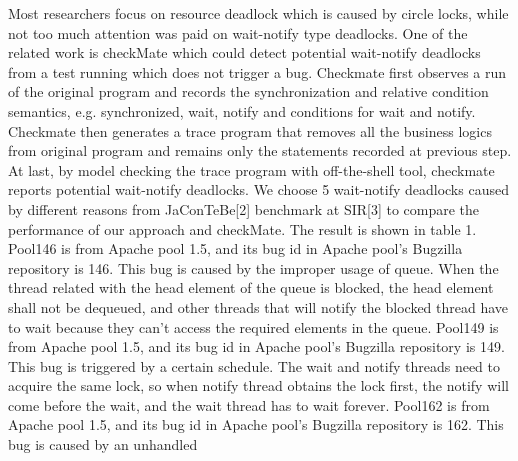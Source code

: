 \documentclass{sigplanconf}
\begin{document}
Most researchers focus on resource deadlock which is caused by circle locks, while not too much attention was paid on wait-notify type deadlocks. One of the related work is checkMate\cite{joshi2010effective} which could detect potential wait-notify deadlocks from a test running which does not trigger a bug. Checkmate first observes a run of the original program and records the synchronization and relative condition semantics, e.g. synchronized, wait, notify and conditions for wait and notify. Checkmate then generates a trace program that removes all the business logics from original program and remains only the statements recorded at previous step. At last, by model checking the trace program with off-the-shell tool, checkmate reports potential wait-notify deadlocks.
We choose 5 wait-notify deadlocks caused by different reasons from JaConTeBe[2] benchmark at SIR[3] to compare the performance of our approach and checkMate. The result is shown in table 1.
Pool146 is from Apache pool 1.5, and its bug id in Apache pool’s Bugzilla repository is 146. This bug is caused by the improper usage of queue. When the thread related with the head element of the queue is blocked, the head element shall not be dequeued, and other threads that will notify the blocked thread have to wait because they can’t access the required elements in the queue.
Pool149 is from Apache pool 1.5, and its bug id in Apache pool’s Bugzilla repository is 149. This bug is triggered by a certain schedule. The wait and notify threads need to acquire the same lock, so when notify thread obtains the lock first, the notify will come before the wait, and the wait thread has to wait forever.
Pool162 is from Apache pool 1.5, and its bug id in Apache pool’s Bugzilla repository is 162. This bug is caused by an unhandled
\end{document}
